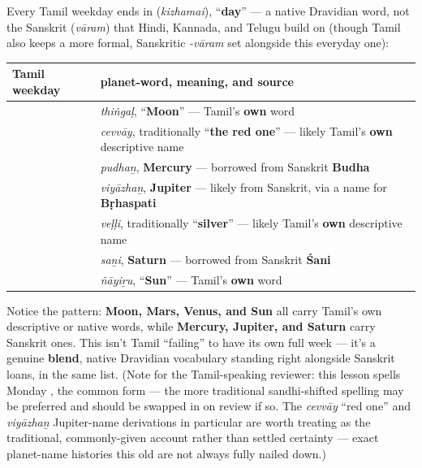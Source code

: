 \begin{grammarlens}[title={Grammar Lens: The pattern: {[}planet{]} + \ta{கிழமை}, \textquotedblleft{}day\textquotedblright{}}]
Every Tamil weekday ends in \textbf{} (\emph{kizhamai}), \textquotedblleft{}\textbf{day}\textquotedblright{} — a native Dravidian word, not the Sanskrit \textbf{} (\emph{vāram}) that Hindi, Kannada, and Telugu build on (though Tamil also keeps a more formal, Sanskritic \emph{-vāram} set alongside this everyday one):

\noindent
\begin{tabularx}{\linewidth}{@{}>{\raggedright\arraybackslash}X>{\raggedright\arraybackslash}X@{}}
\toprule
\textbf{Tamil weekday} & \textbf{planet-word, meaning, and source} \\
\midrule
\textbf{\ta{திங்கள்கிழமை}} & \emph{thiṅgaḷ}, \textquotedblleft{}\textbf{Moon}\textquotedblright{} — Tamil's \textbf{own} word \\
\textbf{\ta{செவ்வாய்க்கிழமை}} & \emph{cevvāy}, traditionally \textquotedblleft{}\textbf{the red one}\textquotedblright{} — likely Tamil's \textbf{own} descriptive name \\
\textbf{\ta{புதன்கிழமை}} & \emph{pudhaṉ}, \textbf{Mercury} — borrowed from Sanskrit \textbf{Budha} \\
\textbf{\ta{வியாழக்கிழமை}} & \emph{viyāzhaṉ}, \textbf{Jupiter} — likely from Sanskrit, via a name for \textbf{Bṛhaspati} \\
\textbf{\ta{வெள்ளிக்கிழமை}} & \emph{veḷḷi}, traditionally \textquotedblleft{}\textbf{silver}\textquotedblright{} — likely Tamil's \textbf{own} descriptive name \\
\textbf{\ta{சனிக்கிழமை}} & \emph{saṉi}, \textbf{Saturn} — borrowed from Sanskrit \textbf{Śani} \\
\textbf{\ta{ஞாயிற்றுக்கிழமை}} & \emph{ñāyiṟu}, \textquotedblleft{}\textbf{Sun}\textquotedblright{} — Tamil's \textbf{own} word \\
\bottomrule
\end{tabularx}
\end{grammarlens}

\begin{culture}
Notice the pattern: \textbf{Moon, Mars, Venus, and Sun} all carry Tamil's own descriptive or native words, while \textbf{Mercury, Jupiter, and Saturn} carry Sanskrit ones. This isn't Tamil \textquotedblleft{}failing\textquotedblright{} to have its own full week — it's a genuine \textbf{blend}, native Dravidian vocabulary standing right alongside Sanskrit loans, in the same list. (Note for the Tamil-speaking reviewer: this lesson spells Monday \textbf{}, the common form — the more traditional sandhi-shifted spelling \textbf{} may be preferred and should be swapped in on review if so. The \emph{cevvāy} \textquotedblleft{}red one\textquotedblright{} and \emph{viyāzhaṉ} Jupiter-name derivations in particular are worth treating as the traditional, commonly-given account rather than settled certainty — exact planet-name histories this old are not always fully nailed down.)
\end{culture}


